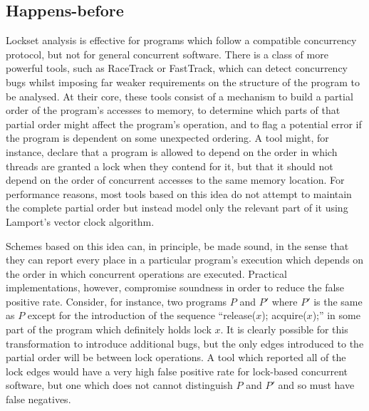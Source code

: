 
\subsection{Happens-before}

Lockset analysis is effective for programs which follow a compatible
concurrency protocol, but not for general concurrent software.  There
is a class of more powerful tools, such as RaceTrack\cite{Yu2005} or
FastTrack\cite{Flanagan2009}, which can detect concurrency bugs whilst
imposing far weaker requirements on the structure of the program to be
analysed.  At their core, these tools consist of a mechanism to build
a partial order of the program's accesses to memory, to determine
which parts of that partial order might affect the program's
operation, and to flag a potential error if the program is dependent
on some unexpected ordering.  A tool might, for instance, declare that
a program is allowed to depend on the order in which threads are
granted a lock when they contend for it, but that it should not depend
on the order of concurrent accesses to the same memory location.  For
performance reasons, most tools based on this idea do not attempt to
maintain the complete partial order but instead model only the
relevant part of it using Lamport's vector clock
algorithm\cite{Lamport1978}.

Schemes based on this idea can, in principle, be made sound, in the
sense that they can report every place in a particular program's
execution which depends on the order in which concurrent operations
are executed.  Practical implementations, however, compromise
soundness in order to reduce the false positive rate.  Consider, for
instance, two programs $P$ and $P'$ where $P'$ is the same as $P$
except for the introduction of the sequence ``release($x$);
acquire($x$);'' in some part of the program which definitely holds
lock $x$.  It is clearly possible for this transformation to introduce
additional bugs, but the only edges introduced to the partial order
will be between lock operations.  A tool which reported all of the
lock edges would have a very high false positive rate for lock-based
concurrent software, but one which does not cannot distinguish $P$ and
$P'$ and so must have false negatives.


